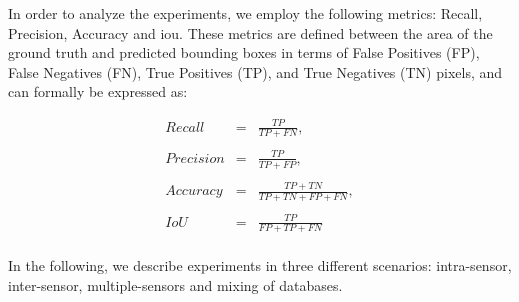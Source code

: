 \documentclass[conference]{IEEEtran}
\begin{document}
In order to analyze the experiments, we employ the following metrics: Recall, Precision, Accuracy and \gls*{iou}. 
These metrics are defined between the area of the ground truth and predicted bounding boxes in terms of False Positives (FP), False Negatives (FN), True Positives (TP), and True Negatives (TN) pixels, and can formally be expressed as:


\begin{eqnarray*}
\textit{Recall }              &=& \frac{TP}{TP+FN},\\ \\ 
\textit{Precision}            &=& \frac{TP}{TP+FP},\\ \\ 
\textit{Accuracy}             &=& \frac{TP+TN}{TP+TN+FP+FN},\\ \\ 
\textit{IoU}   				  &=& \frac{TP}{FP+TP+FN} \\
\end{eqnarray*}

In the following, we describe experiments in three different scenarios: intra-sensor, inter-sensor, multiple-sensors and mixing of databases.
\end{document}
